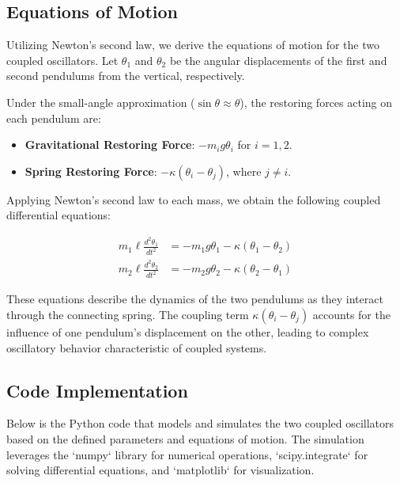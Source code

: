 \documentclass[12pt]{report} %
\begin{document}
    \subsection{Equations of Motion}
    \label{subsec:part1_task1_equations}
    
    Utilizing Newton's second law, we derive the equations of motion for the two coupled oscillators. Let \( \theta_1 \) and \( \theta_2 \) be the angular displacements of the first and second pendulums from the vertical, respectively.
    
    Under the small-angle approximation (\( \sin\theta \approx \theta \)), the restoring forces acting on each pendulum are:
    
    \begin{itemize}
        \item \textbf{Gravitational Restoring Force}: \( -m_i g \theta_i \) for \( i = 1, 2 \).
        \item \textbf{Spring Restoring Force}: \( -\kappa (\theta_i - \theta_j) \), where \( j \neq i \).
    \end{itemize}
    
    Applying Newton's second law to each mass, we obtain the following coupled differential equations:
    
    \begin{align}
    m_1 \ell \frac{d^2 \theta_1}{dt^2} &= -m_1 g \theta_1 - \kappa (\theta_1 - \theta_2) \label{eq:motion1} \\
    m_2 \ell \frac{d^2 \theta_2}{dt^2} &= -m_2 g \theta_2 - \kappa (\theta_2 - \theta_1) \label{eq:motion2}
    \end{align}
    
    These equations describe the dynamics of the two pendulums as they interact through the connecting spring. The coupling term \( \kappa (\theta_i - \theta_j) \) accounts for the influence of one pendulum's displacement on the other, leading to complex oscillatory behavior characteristic of coupled systems.
    
    \subsection{Code Implementation}
    \label{subsec:part1_task1_code}
    
    Below is the Python code that models and simulates the two coupled oscillators based on the defined parameters and equations of motion. The simulation leverages the `numpy` library for numerical operations, `scipy.integrate` for solving differential equations, and `matplotlib` for visualization.
    
\end{document}
